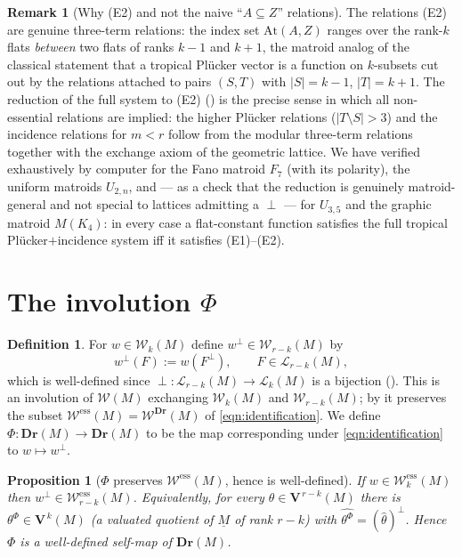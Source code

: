 \documentclass{article}
\newtheorem{proposition}[theorem]{Proposition}
\theoremstyle{definition}
\newtheorem{definition}[theorem]{Definition}
\newtheorem{remark}[theorem]{Remark}
\newcommand{\Dr}{\mathbf{Dr}}
\newcommand{\bV}{\mathbf V}
\newcommand{\cLL}{\mathcal{L}}
\newcommand{\cW}{\mathcal{W}}
\begin{document}
\begin{remark}[Why (E2) and not the naive ``$A\subseteq Z$'' relations]\label{rmk:scope}
The relations (E2) are genuine three-term relations: the index set $\mathrm{At}(A,Z)$ ranges over
the rank-$k$ flats \emph{between} two flats of ranks $k-1$ and $k+1$, the matroid analog of the
classical statement that a tropical Pl\"ucker vector is a function on $k$-subsets cut out by the
relations attached to pairs $(S,T)$ with $|S|=k-1$, $|T|=k+1$. The reduction of the full system to
(E2) () is the precise sense in which all non-essential relations are
implied: the higher Pl\"ucker relations ($|T\setminus S|>3$) and the incidence relations for $m<r$
follow from the modular three-term relations together with the exchange axiom of the geometric
lattice. We have verified  exhaustively by computer for the Fano
matroid $F_7$ (with its polarity), the uniform matroids $U_{2,n}$, and --- as a check that the
reduction  is genuinely matroid-general and not special to lattices admitting
a $\perp$ --- for $U_{3,5}$ and the graphic matroid $M(K_4)$: in every case a flat-constant function
satisfies the full tropical Pl\"ucker$+$incidence system iff it satisfies (E1)--(E2).
\end{remark}

\section{The involution \texorpdfstring{$\Phi$}{Phi}}

\begin{definition}\label{def:Phi}
For $w\in\cW_k(M)$ define $w^{\perp}\in\cW_{r-k}(M)$ by
\begin{equation}\label{eqn:Phi-flat}
  w^{\perp}(F):=w(F^{\perp}),\qquad F\in\cLL_{r-k}(M),
\end{equation}
which is well-defined since $\perp\colon\cLL_{r-k}(M)\to\cLL_k(M)$ is a bijection ().
This is an involution of $\cW(M)$ exchanging $\cW_k(M)$ and $\cW_{r-k}(M)$; by  it
preserves the subset $\cW^{\mathrm{ess}}(M)=\cW^{\Dr}(M)$ of \eqref{eqn:identification}. We define
$\Phi\colon\Dr(M)\to\Dr(M)$ to be the map corresponding under \eqref{eqn:identification} to
$w\mapsto w^{\perp}$.
\end{definition}

\begin{proposition}[$\Phi$ preserves $\cW^{\mathrm{ess}}(M)$, hence is well-defined]\label{prop:wd}
If $w\in\cW^{\mathrm{ess}}_k(M)$ then $w^{\perp}\in\cW^{\mathrm{ess}}_{r-k}(M)$. Equivalently, for
every $\theta\in\bV^{\,r-k}(M)$ there is $\theta^{\Phi}\in\bV^{\,k}(M)$ (a valuated quotient of
$\underline M$ of rank $r-k$) with $\widehat{\theta^{\Phi}}=(\widehat\theta)^{\perp}$. Hence $\Phi$
is a well-defined self-map of $\Dr(M)$.
\end{proposition}
\end{document}

